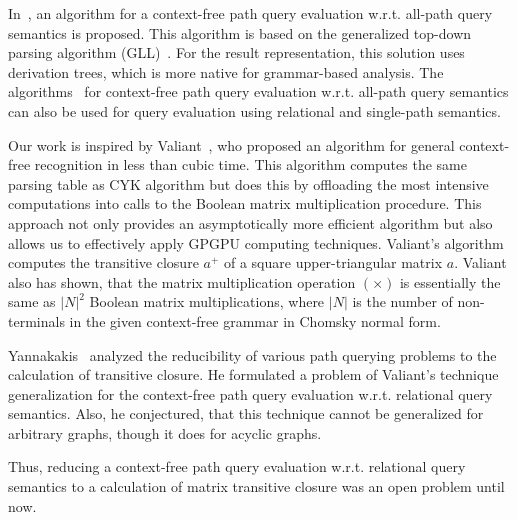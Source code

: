 In~\cite{GLL}, an algorithm for a context-free path query evaluation w.r.t. all-path query semantics is proposed. This algorithm is based on the generalized top-down parsing algorithm (GLL)~\cite{scott2010gll}. For the result representation, this solution uses derivation trees, which is more native for grammar-based analysis. The algorithms~\cite{GLL, hellingsPathQuerying} for context-free path query evaluation w.r.t. all-path query semantics can also be used for query evaluation using relational and single-path semantics.

Our work is inspired by Valiant~\cite{valiant}, who proposed an algorithm for general context-free recognition in less than cubic time. This algorithm computes the same parsing table as CYK algorithm but does this by offloading the most intensive computations into calls to the Boolean matrix multiplication procedure. This approach not only provides an asymptotically more efficient algorithm but also allows us to effectively apply GPGPU computing techniques. Valiant's algorithm computes the transitive closure $a^+$ of a square upper-triangular matrix $a$. Valiant also has shown, that the matrix multiplication operation $(\times)$ is essentially the same as $|N|^2$ Boolean matrix multiplications, where $|N|$ is the number of non-terminals in the given context-free grammar in Chomsky normal form.

Yannakakis~\cite{transitive-closure} analyzed the reducibility of various path querying problems to the calculation of transitive closure. He formulated a problem of Valiant's technique generalization for the context-free path query evaluation w.r.t. relational query semantics. Also, he conjectured, that this technique cannot be generalized for arbitrary graphs, though it does for acyclic graphs.

Thus, reducing a context-free path query evaluation w.r.t. relational query semantics to a calculation of matrix transitive closure was an open problem until now.
